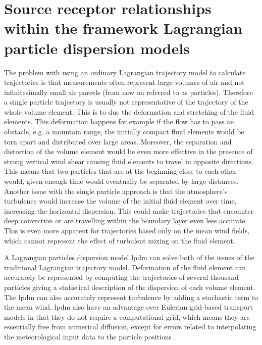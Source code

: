 
\chapter{Source receptor relationships within the framework Lagrangian particle dispersion models}\label{appendix:lpdm_SRR}

The problem with using an ordinary Lagrangian trajectory model to calculate trajectories is that measurements 
often represent large volumes of air and not infinitesimally small air parcels (from now on referred to as 
particles). Therefore a single particle trajectory is usually not representative of the trajectory of the 
whole volume element. This is to due the deformation and stretching of the fluid elements. This deformation 
happens for example if the flow has to pass an obstacle, e.g. a mountain range, the initially compact fluid 
elements would be torn apart and distributed over large areas. Moreover, the separation and distortion of the
volume element would be even more effective in the presence of strong vertical wind shear causing fluid 
elements to travel in opposite directions. This means that two particles that are at the beginning close to 
each other would, given enough time would eventually be separated by large distances. Another issue with the 
single particle approach is that the atmosphere's turbulence would increase the volume of the initial 
fluid element over time, increasing the horizontal dispersion. This could make trajectories that encounter 
deep convection or are travelling within the boundary layer even less accurate. This is even more apparent for 
trajectories based only on the mean wind fields, which cannot represent the effect of turbulent 
mixing on the fluid element. 

A Lagrangian particles dispersion model \acrshort{lpdm} can solve both of the issues 
of the traditional Lagrangian trajectory model. Deformation of the fluid element can accurately be 
represented by computing the trajectories of several thousand particles giving a statistical description of 
the dispersion of each volume element. The \acrshort{lpdm} can also accurately represent turbulence by adding a 
stochastic term to the mean wind. 
\acrshort{lpdm} also have an advantage over Eulerian grid-based transport models in that they do not require a 
computational grid, which means they are essentially free from numerical diffusion, except for errors 
related to interpolating the meteorological input data to the particle positions 
\parencite{cassiani_offline_2016}. 

